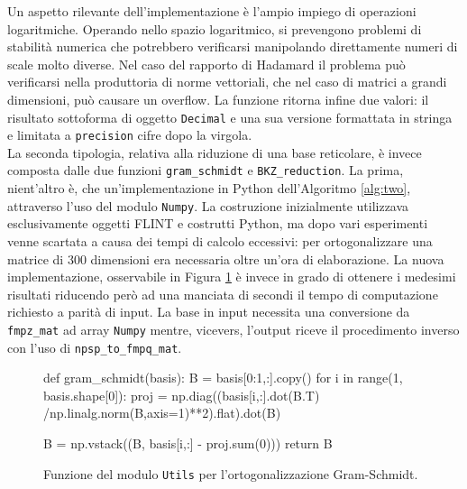 Un aspetto rilevante dell'implementazione è l'ampio impiego di operazioni logaritmiche.
Operando nello spazio logaritmico, si prevengono problemi di stabilità numerica che 
potrebbero verificarsi manipolando direttamente numeri di scale molto diverse. Nel caso
del rapporto di Hadamard il problema può verificarsi nella produttoria di norme vettoriali,
che nel caso di matrici a grandi dimensioni, può causare un overflow. 
La funzione ritorna infine due valori: il risultato sottoforma di oggetto \texttt{Decimal}
e una sua versione formattata in stringa e limitata a \texttt{precision} cifre dopo la virgola. \\
La seconda tipologia, relativa alla riduzione di una base reticolare, è invece composta
dalle due funzioni \texttt{gram\_schmidt} e \texttt{BKZ\_reduction}. La prima, nient'altro 
è, che un'implementazione in Python dell'Algoritmo \ref{alg:two}, attraverso l'uso del
modulo \texttt{Numpy}. La costruzione inizialmente utilizzava esclusivamente oggetti FLINT 
e costrutti Python, ma dopo vari esperimenti venne scartata a causa dei tempi di calcolo 
eccessivi: per ortogonalizzare una matrice di 300 dimensioni era necessaria oltre 
un'ora di elaborazione. La nuova implementazione, osservabile in Figura \ref{fig:utils_gram_schmidt}
è invece in grado di ottenere i medesimi risultati riducendo però ad una manciata di 
secondi il tempo di computazione richiesto a parità di input. 
La base in input necessita una conversione da \texttt{fmpz\_mat} ad 
array \texttt{Numpy} mentre, vicevers, l'output riceve il procedimento inverso con l'uso 
di \texttt{npsp\_to\_fmpq\_mat}.

\begin{figure}[H]
    \begin{python}
        def gram_schmidt(basis):
            B = basis[0:1,:].copy()
            for i in range(1, basis.shape[0]):
                proj = np.diag((basis[i,:].dot(B.T)
                        /np.linalg.norm(B,axis=1)**2).flat).dot(B)

                B = np.vstack((B, basis[i,:] - proj.sum(0)))
            return B
    \end{python}
    \caption{Funzione del modulo \texttt{Utils} per l'ortogonalizzazione Gram-Schmidt.}
    \label{fig:utils_gram_schmidt}
\end{figure}

